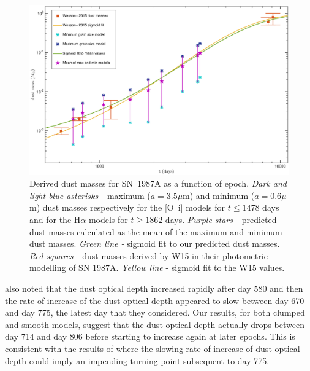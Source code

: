 \documentclass[useAMS,usenatbib,usegraphicx]{mnras}
\begin{document}
\begin{figure}
\begin{center}
\includegraphics[trim =100 30 105 15,clip=true,scale=0.48]{Mdust_evol4}
\caption{Derived dust masses for SN~1987A as a function of epoch.  \textit{Dark and light blue asterisks -} maximum ($a=3.5\mu$m) and 
minimum ($a=0.6\mu$m) dust masses respectively for the [O~{\sc i}] models for $t \le 1478$ days and for the H$\alpha$ models for $t \ge 1862$ days. \textit{Purple 
stars -} predicted dust masses calculated as the mean of the maximum and minimum dust masses.
\textit{Green line -} sigmoid fit 
to our predicted dust masses. \textit{Red squares -} dust masses derived by W15 
in their photometric modelling of SN 1987A. \textit{Yellow line} - sigmoid fit to 
the W15 values.}
\label{Mdust}
\end{center}
\end{figure}

\citet{Lucy1989} also noted that the dust optical depth increased rapidly after day 580 and then the rate of increase of the dust optical depth appeared to slow between day 670 and day 775, the latest day that they considered.  Our results, for both clumped and smooth models, suggest that the dust optical depth actually drops between day 714 and day 806 before starting to increase again at later epochs.  This is consistent with the results of \citet{Lucy1989} where the slowing rate of increase of dust optical depth could imply an impending turning point subsequent to day 775.  
\end{document}
